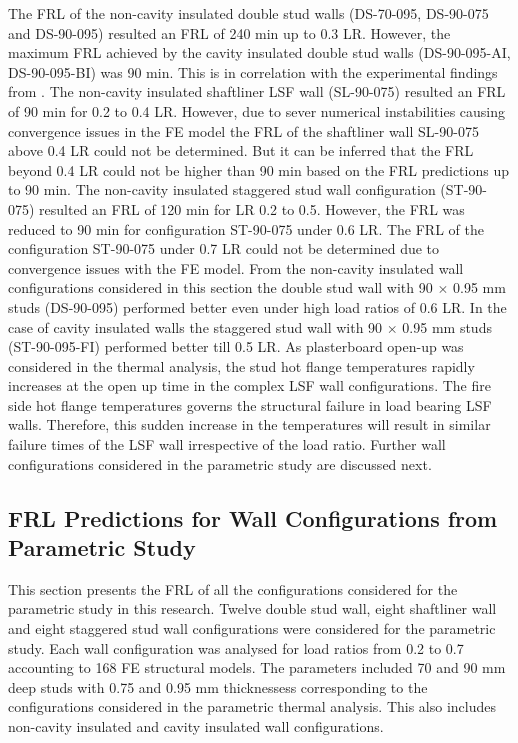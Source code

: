 The FRL of the non-cavity insulated double stud walls (DS-70-095, DS-90-075 and DS-90-095) resulted an FRL of 240 min up to 0.3 LR. However, the maximum FRL achieved by the cavity insulated double stud walls (DS-90-095-AI, DS-90-095-BI) was 90 min. This is in correlation with the experimental findings from . The non-cavity insulated shaftliner LSF wall (SL-90-075) resulted an FRL of 90 min for 0.2 to 0.4 LR. However, due to sever numerical instabilities causing convergence issues in the FE model the FRL of the shaftliner wall SL-90-075 above 0.4 LR could not be determined. But it can be inferred that the FRL beyond 0.4 LR could not be higher than 90 min based on the FRL predictions up to 90 min. The non-cavity insulated staggered stud wall configuration (ST-90-075) resulted an FRL of 120 min for LR 0.2 to 0.5. However, the FRL was reduced to 90 min for configuration ST-90-075 under 0.6 LR. The FRL of the configuration ST-90-075 under 0.7 LR could not be determined due to convergence issues with the FE model. From the non-cavity insulated wall configurations considered in this section the double stud wall with 90 $\times$ 0.95 mm studs (DS-90-095) performed better even under high load ratios of 0.6 LR. In the case of cavity insulated walls the staggered stud wall with 90 $\times$ 0.95 mm studs (ST-90-095-FI) performed better till 0.5 LR. As plasterboard open-up was considered in the thermal analysis, the stud hot flange temperatures rapidly increases at the open up time in the complex LSF wall configurations. The fire side hot flange temperatures governs the structural failure in load bearing LSF walls. Therefore, this sudden increase in the temperatures will result in similar failure times of the LSF wall irrespective of the load ratio. Further wall configurations considered in the parametric study are discussed next.

\subsection{FRL Predictions for Wall Configurations from Parametric Study}

This section presents the FRL of all the configurations considered for the parametric study in this research. Twelve double stud wall, eight shaftliner wall and eight staggered stud wall configurations were considered for the parametric study. Each wall configuration was analysed for load ratios from 0.2 to 0.7 accounting to 168 FE structural models. The parameters included 70 and 90 mm deep studs with 0.75 and 0.95 mm thicknessess corresponding to the configurations considered in the parametric thermal analysis. This also includes non-cavity insulated and cavity insulated wall configurations.

